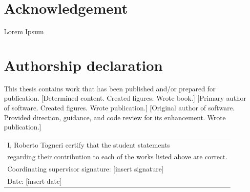 \documentclass{book}
\begin{document}
\chapter*{Acknowledgement}
Lorem Ipsum 

\chapter*{Authorship declaration}



\begin{flushleft}
	This thesis contains work that has been published and/or prepared for publication. 
	[Determined content. Created figures. Wrote book.]
	[Primary author of software. Created figures. Wrote publication.]
	[Original author of software. Provided direction, guidance, and code review for its enhancement. Wrote publication.]
	
	\vfill
	\vskip 0.5cm
	\begin{tabular}{l}
		I, Roberto Togneri certify that the student statements \\ regarding their contribution to each of the works listed above are correct. \\
		Coordinating supervisor signature: {[insert signature]}\\
		Date: {[insert date]}
	\end{tabular}
	\vspace{3cm}
\end{flushleft}
\end{document}
